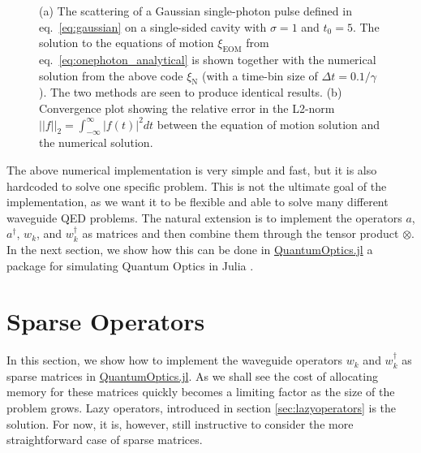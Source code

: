 \begin{figure}[H]
    \centering
        
    \caption{(a) The scattering of a Gaussian single-photon pulse defined in eq.~\eqref{eq:gaussian} on a single-sided cavity with $\sigma = 1$ and $t_0 = 5$. The solution to the equations of motion $\xi_\mathrm{EOM}$ from eq.~\eqref{eq:onephoton_analytical} is shown together with the numerical solution from the above code $\xi_\mathrm{N}$ (with a time-bin size of $\Delta t = 0.1/\gamma$). The two methods are seen to produce identical results. (b) Convergence plot showing the relative error in the L2-norm $||f||_2 = \int_{-\infty}^\infty |f(t)|^2 d t $ between the equation of motion solution and the numerical solution. }
\end{figure}

The above numerical implementation is very simple and fast, but it is also hardcoded to solve one specific problem. This is not the ultimate goal of the implementation, as we want it to be flexible and able to solve many different waveguide QED problems. The natural extension is to implement the operators $a$, $a^\dagger$, $w_k$, and $w_k^\dagger$ as matrices and then combine them through the tensor product $\otimes$. In the next section, we show how this can be done in 
\href{https://qojulia.org/}{QuantumOptics.jl} a package for simulating Quantum Optics in Julia \cite{Kramer2018QuantumOptics.jl:Systems}.

\section{Sparse Operators \label{sec:sparseoperators}}
In this section, we show how to implement the waveguide operators $w_k$ and $w_k^\dagger$ as sparse matrices in \href{https://qojulia.org/}{QuantumOptics.jl}. As we shall see the cost of allocating memory for these matrices quickly becomes a limiting factor as the size of the problem grows. Lazy operators, introduced in section \ref{sec:lazyoperators} is the solution. For now, it is, however, still instructive to consider the more straightforward case of sparse matrices. 

